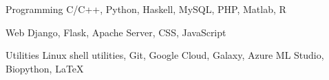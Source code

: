 
\vspace{-0.3cm}


\begin{cvskills}


  \cvskill
  {Programming}
  {C/C++, Python, Haskell, MySQL, PHP, Matlab, R}


  \cvskill
  {Web}
  {Django, Flask, Apache Server, CSS, JavaScript }


  \cvskill
  {Utilities}
  {Linux shell utilities, Git, Google Cloud,
    Galaxy, Azure ML Studio, Biopython, \LaTeX}


\end{cvskills}

